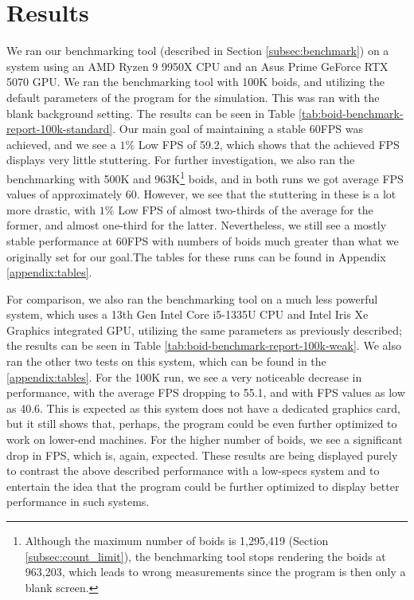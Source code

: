 \documentclass[a4paper, 12pt]{article}
\begin{document}
\section{Results}
\label{sec:results}
We ran our benchmarking tool (described in Section \ref{subsec:benchmark}) on a system using an AMD Ryzen 9 9950X CPU and an Asus Prime GeForce RTX 5070 GPU. We ran the benchmarking tool with 100K boids, and utilizing the default parameters of the program for the simulation. This was ran with the blank background setting. The results can be seen in Table \ref{tab:boid-benchmark-report-100k-standard}. Our main goal of maintaining a stable 60FPS was achieved, and we see a $1\%$ Low FPS of 59.2, which shows that the achieved FPS displays very little stuttering. For further investigation, we also ran the benchmarking with 500K and 963K\footnote{Although the maximum number of boids is 1,295,419 (Section \ref{subsec:count_limit}), the benchmarking tool stops rendering the boids at 963,203, which leads to wrong measurements since the program is then only a blank screen.} boids, and in both runs we got average FPS values of approximately 60. However, we see that the stuttering in these is a lot more drastic, with $1\%$ Low FPS of almost two-thirds of the average for the former, and almost one-third for the latter. Nevertheless, we still see a mostly stable performance at 60FPS with numbers of boids much greater than what we originally set for our goal.The tables for these runs can be found in Appendix \ref{appendix:tables}.

\hspace{5.0ex}

For comparison, we also ran the benchmarking tool on a much less powerful system, which uses a 13th Gen Intel Core i5-1335U CPU and Intel Iris Xe Graphics integrated GPU, utilizing the same parameters as previously described; the results can be seen in Table \ref{tab:boid-benchmark-report-100k-weak}. We also ran the other two tests on this system, which can be found in the \ref{appendix:tables}. For the 100K run, we see a very noticeable decrease in performance, with the average FPS dropping to 55.1, and with FPS values as low as 40.6. This is expected as this system does not have a dedicated graphics card, but it still shows that, perhaps, the program could be even further optimized to work on lower-end machines. For the higher number of boids, we see a significant drop in FPS, which is, again, expected. These results are being displayed purely to contrast the above described performance with a low-specs system and to entertain the idea that the program could be further optimized to display better performance in such systems.
\end{document}
